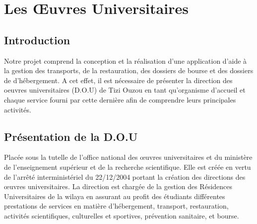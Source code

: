 \chapter{Les Œuvres Universitaires}

\section{Introduction}
    Notre projet comprend la conception et la réalisation d'une application d'aide à la gestion des transports, de la restauration, des dossiers de bourse et des dossiers de d'hébergement. A cet effet, il est nécessaire de présenter la direction des oeuvres universitaires (D.O.U) de Tizi Ouzou en tant qu'organisme d'accueil et chaque service fourni par cette dernière afin de comprendre leurs principales activités.\\

\section{Présentation de la D.O.U}
    Placée sous la tutelle de l’office national des œuvres universitaires et du ministère de l’enseignement supérieur et de la recherche scientifique. Elle est créée en vertu de l’arrêté interministériel du 22/12/2004 portant la création des directions des œuvres universitaires. La direction est chargée de la gestion des Résidences Universitaires de la wilaya en assurant au profit des étudiants différentes prestations de services en matière d’hébergement, transport, restauration, activités scientifiques, culturelles et sportives, prévention sanitaire, et bourse.\\

